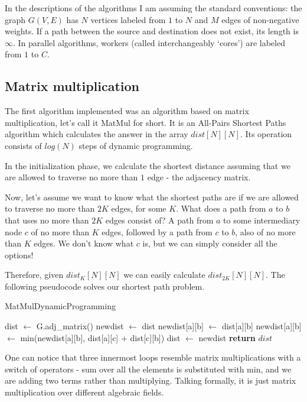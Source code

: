 \documentclass[12pt,a4paper,oneside,openright]{report}
\begin{document}
In the descriptions of the algorithms I am assuming the standard conventions: the graph $G(V,E)$ has $N$ vertices labeled from $1$ to $N$ and $M$ edges of non-negative weights. If a path between the source and destination does not exist, its length is $\infty$. In parallel algorithms, workers (called interchangeably `cores') are labeled from $1$ to $C$.

\subsection{Matrix multiplication}
The first algorithm implemented was an algorithm based on matrix multiplication, let's call it MatMul for short. It is an All-Pairs Shortest Paths algorithm which calculates the answer in the array $dist[N][N]$. Its operation consists of $log(N)$ steps of dynamic programming.

In the initialization phase, we calculate the shortest distance assuming that we are allowed to traverse no more than $1$ edge - the adjacency matrix.

Now, let's assume we want to know what the shortest paths are if we are allowed to traverse no more than $2K$ edges, for some $K$. What does a path from $a$ to $b$ that uses no more than $2K$ edges consist of? A path from $a$ to some intermediary node $c$ of no more than $K$ edges, followed by a path from $c$ to $b$, also of no more than $K$ edges. We don't know what $c$ is, but we can simply consider all the options! 

Therefore, given $dist_{K}[N][N]$ we can easily calculate $dist_{2K}[N][N]$. The following pseudocode solves our shortest path problem.

\begin{algorithm}
\caption{MatMulDynamicProgramming}\label{matmuldp}
\begin{algorithmic}[1]
\State dist $\gets$ G.adj\_matrix()
\State newdist $\gets$ dist
            \State newdist[a][b] $\gets$ dist[a][b]
            \State newdist[a][b] $\gets$ min(newdist[a][b], dist[a][c] $+$ dist[c][b])
        \EndFor
        \EndFor
        \EndFor
        \State dist $\gets$ newdist
      \EndFor
\State \textbf{return} $dist$
\EndProcedure
\end{algorithmic}
\end{algorithm}

One can notice that three innermost loops resemble matrix multiplications with a switch of operators - sum over all the elements is substituted with min, and we are adding two terms rather than multiplying. Talking formally, it is just matrix multiplication over different algebraic fields. 
\end{document}

